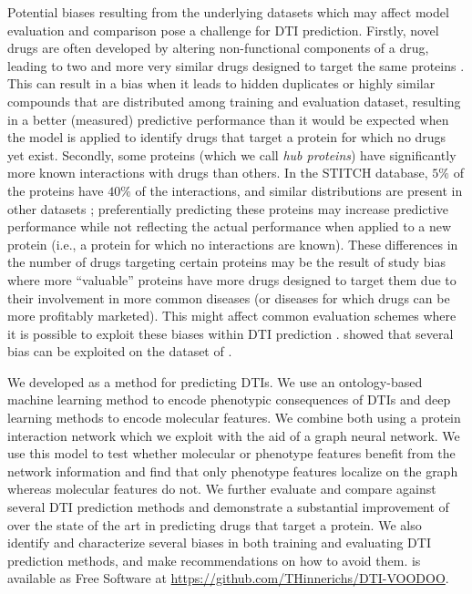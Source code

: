 \documentclass{bioinfo}
\renewcommand{\cite}{\citep}
\begin{document}
Potential biases resulting from the underlying datasets
\citep{Pahikkala2014} which may affect model evaluation and comparison
pose a challenge for DTI prediction. Firstly, novel drugs are often
developed by altering non-functional components of a drug, leading to
two and more very similar drugs designed to target the same proteins
\cite{Overington2006}. This can result in a bias when it leads to
hidden duplicates or highly similar compounds that are distributed
among training and evaluation dataset, resulting in a better
(measured) predictive performance than it would be expected when the
model is applied to identify drugs that target a protein for which no
drugs yet exist. Secondly, some proteins (which we call \textit{hub
  proteins}) have significantly more known interactions with drugs
than others. In the STITCH database, $5\%$ of the proteins have $40\%$
of the interactions, and similar distributions are present in other
datasets \cite{Drugbank2007, Drugbank2017}; preferentially predicting
these proteins may increase predictive performance while not
reflecting the actual performance when applied to a new protein (i.e.,
a protein for which no interactions are known). These differences in
the number of drugs targeting certain proteins may be the result of
study bias where more ``valuable'' proteins have more drugs designed
to target them due to their involvement in more common diseases (or
diseases for which drugs can be more profitably marketed). This might
affect common evaluation schemes where it is possible to exploit these
biases within DTI prediction \cite{Survey2018}.
\citet{vanLaarhoven2014} showed that several bias can be exploited on
the dataset of \citet{Yamanishi2008}.

We developed \name{} as a method for predicting DTIs. We use an
ontology-based machine learning method \cite{DL2vec2020} to encode
phenotypic consequences of DTIs and deep learning methods to encode
molecular features. We combine both using a protein interaction
network which we exploit with the aid of a graph neural network. We use this
model to test whether molecular or phenotype features benefit from the
network information and find that only phenotype features localize on
the graph whereas molecular features do not. We further evaluate and
compare \name{} against several DTI prediction methods and demonstrate
a substantial improvement of \name{} over the state of the art in
predicting drugs that target a protein. We also identify and
characterize several biases in both training and evaluating DTI
prediction methods, and make recommendations on how to avoid
them. \name{} is available as Free Software at
\url{https://github.com/THinnerichs/DTI-VOODOO}.
\end{document}
